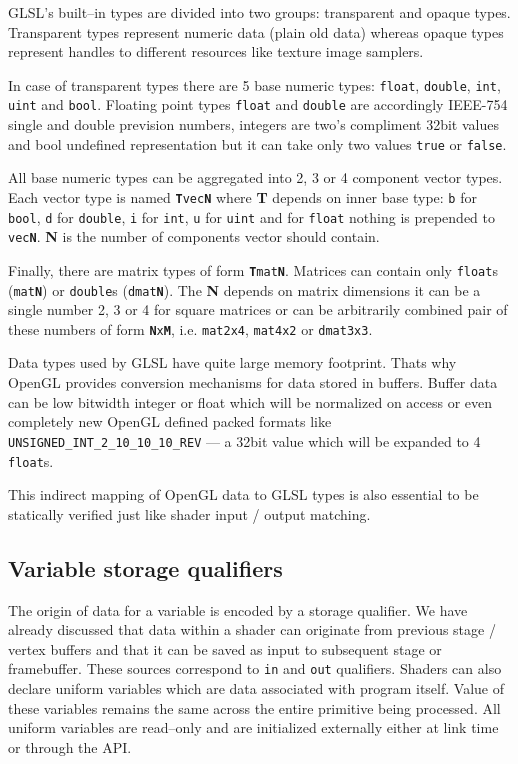 GLSL's built--in types are divided into two groups: transparent and opaque types.
Transparent types represent numeric data (plain old data) whereas opaque types represent handles to different resources like texture image samplers.

In case of transparent types there are 5 base numeric types: \texttt{float}, \texttt{double}, \texttt{int}, \texttt{uint} and \texttt{bool}.
Floating point types \texttt{float} and \texttt{double} are accordingly IEEE-754 single and double prevision numbers, integers are two's compliment 32bit values and bool undefined representation but it can take only two values \texttt{true} or \texttt{false}.

All base numeric types can be aggregated into 2, 3 or 4 component vector types. Each vector type is named \texttt{\textbf{T}vec\textbf{N}}
where \textbf{T} depends on inner base type: \texttt{b} for \texttt{bool}, \texttt{d} for \texttt{double}, \texttt{i} for \texttt{int}, \texttt{u} for \texttt{uint} and for \texttt{float} nothing is prepended to \texttt{vec\textbf{N}}.
\textbf{N} is the number of components vector should contain.

Finally, there are matrix types of form \texttt{\textbf{T}mat\textbf{N}}. Matrices can contain only \texttt{float}s (\texttt{mat\textbf{N}}) or \texttt{double}s (\texttt{dmat\textbf{N}}).
The \textbf{N} depends on matrix dimensions it can be a single number 2, 3 or 4 for square matrices or can be arbitrarily combined pair of these numbers of form \texttt{\textbf{N}x\textbf{M}},
i.e. \texttt{mat2x4}, \texttt{mat4x2} or \texttt{dmat3x3}.

Data types used by GLSL have quite large memory footprint. Thats why OpenGL provides conversion mechanisms for data stored in buffers. Buffer data can be low bitwidth integer or float which will be normalized on access or even completely 
new OpenGL defined packed formats like \texttt{UNSIGNED\_INT\_2\_10\_10\_10\_REV} --- a 32bit value which will be expanded to 4 \texttt{float}s. 

This indirect mapping of OpenGL data to GLSL types is also essential to be statically verified just like shader input / output matching.

\subsection{Variable storage qualifiers}

The origin of data for a variable is encoded by a storage qualifier. We have already discussed that data within a shader can originate from previous stage / vertex buffers and that it can be saved as input to subsequent stage or framebuffer.
These sources correspond to \texttt{in} and \texttt{out} qualifiers. 
Shaders can also declare uniform variables which are data associated with program itself. Value of these variables remains the same across the
entire primitive being processed. All uniform variables are read--only and are initialized externally either at link time or through the API.

